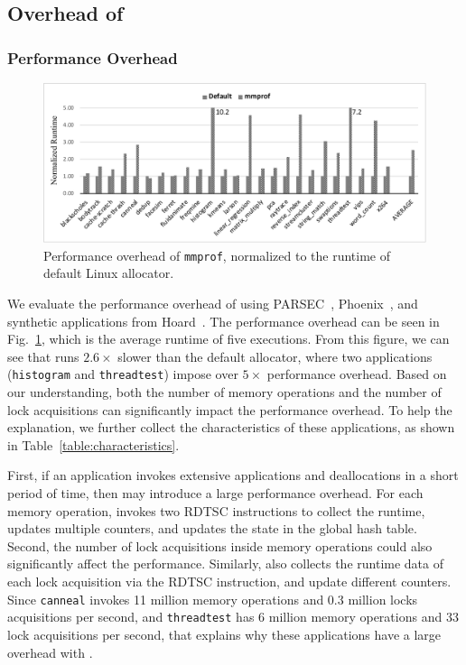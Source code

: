 


\subsection{Overhead of \MP{}}

\subsubsection{Performance Overhead}
\label{sec:perf}

\begin{figure}[!ht]
\centering
\includegraphics[width=\columnwidth]{figures/perfoverhead}
\caption{Performance overhead of \texttt{mmprof}, normalized to the runtime of default Linux allocator.\label{fig:overhead}}
\end{figure}

We evaluate the performance overhead of 
\MP{} using PARSEC~\cite{parsec},  Phoenix~\cite{phoenix}, and synthetic applications from Hoard~\cite{Hoard}. The performance overhead can be seen in Fig.~\ref{fig:overhead}, which is the average runtime of five executions. From this figure, we can see that \MP{} runs $2.6\times$ slower than the default allocator, where two applications (\texttt{histogram} and \texttt{threadtest}) impose over $5\times$ performance overhead. Based on our understanding, both the number of memory operations and the number of lock acquisitions can significantly impact the performance overhead. To help the explanation, we further collect the characteristics of these applications, as shown in Table~\ref{table:characteristics}.  

First, if an application invokes extensive applications and deallocations in a short period of time, then \MP{} may introduce a large performance overhead. For each memory operation, \MP{} invokes two RDTSC instructions to collect the runtime, updates multiple counters, and updates the state in the global hash table. Second, the number of lock acquisitions inside memory operations could also significantly affect the performance. Similarly, \MP{} also collects the runtime data of each lock acquisition via the RDTSC instruction, and update different counters. 
Since \texttt{canneal} invokes 11 million memory operations and 0.3 million locks acquisitions per second, and \texttt{threadtest} has 6 million memory operations and 33 lock acquisitions per second, that explains why these applications have a large overhead with \MP{}.  

